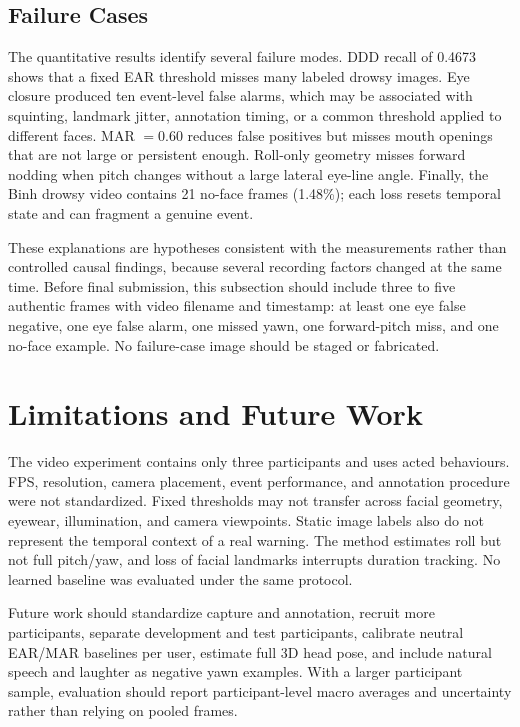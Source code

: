 \documentclass[runningheads]{llncs}
\begin{document}
\subsection{Failure Cases}

The quantitative results identify several failure modes. DDD recall of 0.4673
shows that a fixed EAR threshold misses many labeled drowsy images. Eye closure
produced ten event-level false alarms, which may be associated with squinting,
landmark jitter, annotation timing, or a common threshold applied to different
faces. MAR $=0.60$ reduces false positives but misses mouth openings that are
not large or persistent enough. Roll-only geometry misses forward nodding when
pitch changes without a large lateral eye-line angle. Finally, the Binh drowsy
video contains 21 no-face frames (1.48\%); each loss resets temporal state and
can fragment a genuine event.

These explanations are hypotheses consistent with the measurements rather than
controlled causal findings, because several recording factors changed at the
same time. Before final submission, this subsection should include three to five
authentic frames with video filename and timestamp: at least one eye false
negative, one eye false alarm, one missed yawn, one forward-pitch miss, and one
no-face example. No failure-case image should be staged or fabricated.

\section{Limitations and Future Work}

The video experiment contains only three participants and uses acted behaviours.
FPS, resolution, camera placement, event performance, and annotation procedure
were not standardized. Fixed thresholds may not transfer across facial geometry,
eyewear, illumination, and camera viewpoints. Static image labels also do not
represent the temporal context of a real warning. The method estimates roll but
not full pitch/yaw, and loss of facial landmarks interrupts duration tracking.
No learned baseline was evaluated under the same protocol.

Future work should standardize capture and annotation, recruit more participants,
separate development and test participants, calibrate neutral EAR/MAR baselines
per user, estimate full 3D head pose, and include natural speech and laughter as
negative yawn examples. With a larger participant sample, evaluation should
report participant-level macro averages and uncertainty rather than relying on
pooled frames.
\end{document}
